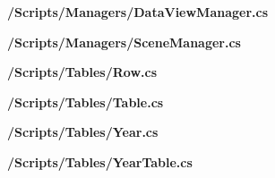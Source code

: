 \begin{landscape}
\textbf{/Scripts/Managers/DataViewManager.cs}


\textbf{/Scripts/Managers/SceneManager.cs}


\textbf{/Scripts/Tables/Row.cs}


\textbf{/Scripts/Tables/Table.cs}


\textbf{/Scripts/Tables/Year.cs}


\textbf{/Scripts/Tables/YearTable.cs}



\end{landscape}